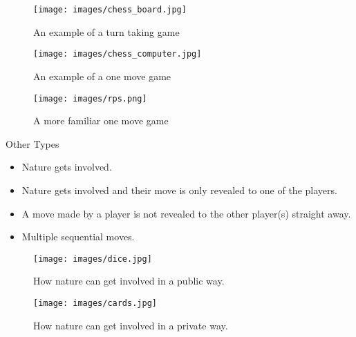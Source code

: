 \documentclass[
  ignorenonframetext,
]{beamer}
\providecommand{\tightlist}{%
  \setlength{\itemsep}{0pt}\setlength{\parskip}{0pt}}
\begin{document}
\begin{frame}
\begin{figure}
\centering
\texttt{[image: images/chess\_board.jpg]}
\caption{An example of a turn taking game}
\end{figure}
\end{frame}

\begin{frame}
\begin{figure}
\centering
\texttt{[image: images/chess\_computer.jpg]}
\caption{An example of a one move game}
\end{figure}
\end{frame}

\begin{frame}
\begin{figure}
\centering
\texttt{[image: images/rps.png]}
\caption{A more familiar one move game}
\end{figure}
\end{frame}

\begin{frame}{Other Types}
\protect\hypertarget{other-types}{}
\begin{itemize}[<+->]
\tightlist
\item
  Nature gets involved.
\item
  Nature gets involved and their move is only revealed to one of the
  players.
\item
  A move made by a player is not revealed to the other player(s)
  straight away.
\item
  Multiple sequential moves.
\end{itemize}
\end{frame}

\begin{frame}
\begin{figure}
\centering
\texttt{[image: images/dice.jpg]}
\caption{How nature can get involved in a public way.}
\end{figure}
\end{frame}

\begin{frame}
\begin{figure}
\centering
\texttt{[image: images/cards.jpg]}
\caption{How nature can get involved in a private way.}
\end{figure}
\end{frame}
\end{document}
